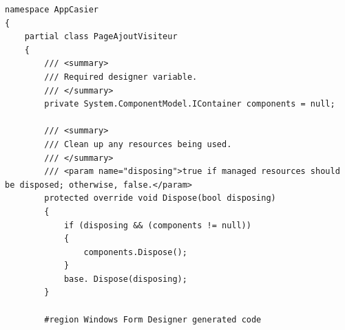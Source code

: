 \documentclass[main.tex]{subfiles}
\begin{document}
\begin{lstlisting}
namespace AppCasier
{
    partial class PageAjoutVisiteur
    {
        /// <summary>
        /// Required designer variable.
        /// </summary>
        private System.ComponentModel.IContainer components = null;

        /// <summary>
        /// Clean up any resources being used.
        /// </summary>
        /// <param name="disposing">true if managed resources should be disposed; otherwise, false.</param>
        protected override void Dispose(bool disposing)
        {
            if (disposing && (components != null))
            {
                components.Dispose();
            }
            base. Dispose(disposing);
        }

        #region Windows Form Designer generated code


\end{lstlisting}
\end{document}
